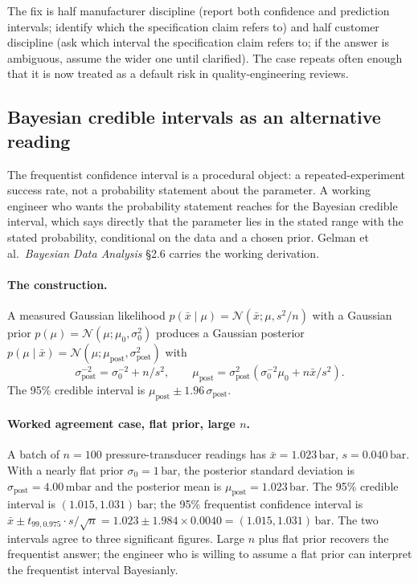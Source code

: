 The fix is half manufacturer discipline (report both confidence and
prediction intervals; identify which the specification claim
refers to) and half customer discipline (ask which interval the
specification claim refers to; if the answer is ambiguous, assume
the wider one until clarified). The case repeats often enough that
it is now treated as a default risk in quality-engineering
reviews.

\subsection{Bayesian credible intervals as an alternative reading}

The frequentist confidence interval is a procedural object: a
repeated-experiment success rate, not a probability statement
about the parameter. A working engineer who wants the
probability statement reaches for the Bayesian credible
interval, which says directly that the parameter lies in the
stated range with the stated probability, conditional on the
data and a chosen prior. Gelman et al.\ \emph{Bayesian Data
Analysis} \cite{text:ch04t3b-gelman-bda3-2013} \S 2.6 carries
the working derivation.

\paragraph{The construction.} A measured Gaussian likelihood
$p(\bar{x} \mid \mu) = \mathcal{N}(\bar{x}; \mu, s^{2}/n)$ with
a Gaussian prior $p(\mu) = \mathcal{N}(\mu; \mu_{0},
\sigma_{0}^{2})$ produces a Gaussian posterior
$p(\mu \mid \bar{x}) = \mathcal{N}(\mu; \mu_{\text{post}},
\sigma_{\text{post}}^{2})$ with
\[
\sigma_{\text{post}}^{-2} = \sigma_{0}^{-2} + n/s^{2},
\qquad
\mu_{\text{post}} = \sigma_{\text{post}}^{2}
\left( \sigma_{0}^{-2} \mu_{0} + n \bar{x}/s^{2} \right).
\]
The 95\% credible interval is
$\mu_{\text{post}} \pm 1.96\,\sigma_{\text{post}}$.

\paragraph{Worked agreement case, flat prior, large $n$.} A
batch of $n = 100$ pressure-transducer readings has
$\bar{x} = 1.023\,\si{\bar}$, $s = 0.040\,\si{\bar}$. With a
nearly flat prior $\sigma_{0} = 1\,\si{\bar}$, the posterior
standard deviation is $\sigma_{\text{post}} = 4.00\,\si{\milli
\bar}$ and the posterior mean is $\mu_{\text{post}} = 1.023\,
\si{\bar}$. The 95\% credible interval is $(1.015, 1.031)\,
\si{\bar}$; the 95\% frequentist confidence interval is
$\bar{x} \pm t_{99,0.975} \cdot s/\sqrt{n} = 1.023 \pm 1.984
\times 0.0040 = (1.015, 1.031)\,\si{\bar}$. The two intervals
agree to three significant figures. Large $n$ plus flat prior
recovers the frequentist answer; the engineer who is willing
to assume a flat prior can interpret the frequentist interval
Bayesianly.

